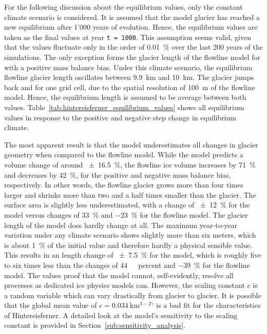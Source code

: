         For the following discussion about the equilibrium values, only the constant climate scenario is considered. It is assumed that the model glacier has reached a new equilibrium after 1'000 years of evolution. Hence, the equilibrium values are taken as the final values at year \lstinline`t = 1000`. This assumption seems valid, given that the values fluctuate only in the order of \SI{0.01}{\percent} over the last 200 years of the simulations.
        The only exception forms the glacier length of the flowline model for with a positive mass balance bias. Under this climate scenario, the equilibrium flowline glacier length oscillates between \SI{9.9}{\kilo\meter} and \SI{10}{\kilo\meter}. The glacier jumps back and for one grid cell, due to the spatial resolution of \SI{100}{\meter} of the flowline model. Hence, the equilibrium length is assumed to be average between both values. Table~\ref{tab:hintereisferner_equilibrium_values} shows all equilibrium values in response to the positive and negative step change in equilibrium climate.

        The most apparent result is that the \vas{} model underestimates all changes in glacier geometry when compared to the flowline model. While the \vas{} model predicts a volume change of around \SI{\pm16.5}{\percent}, the flowline ice volume increases by \SI{71}{\percent} and decreases by \SI{42}{\percent}, for the positive and negative mass balance bias, respectively. In other words, the flowline glacier grows more than four times larger and shrinks more than two and a half times smaller than the \vas{} glacier. The surface area is slightly less underestimated, with a change of \SI{\pm12}{\percent} for the \vas{} model versus changes of \SI{+33}{\percent} and \SI{-23}{\percent} for the flowline model. The glacier length of the \vas{} model does hardly change at all. The maximum year-to-year variation under any climate scenario shows slightly more than six meters, which is about \SI{1}{\percent} of the initial value and therefore hardly a physical sensible value. This results in an length change of \SI{\pm7.5}{\percent} for the \vas model, which is roughly five to six times less than the changes of \SI{+44}{\ percent} and \SI{-39}{\percent} for the flowline model. The values proof that the \vas{} model cannot, self-evidently, resolve all processes as dedicated ice physics models can. However, the scaling constant $c$ is a random variable which can vary drastically from glacier to glacier. It is possible that the global mean value of $c=\SI{0.034}{\kilo\meter^{3-2\gamma}}$ is a bad fit for the characteristics of Hintereisferner. A detailed look at the model's sensitivity to the scaling constant is provided in Section~\ref{sub:sensitivity_analysis}.

